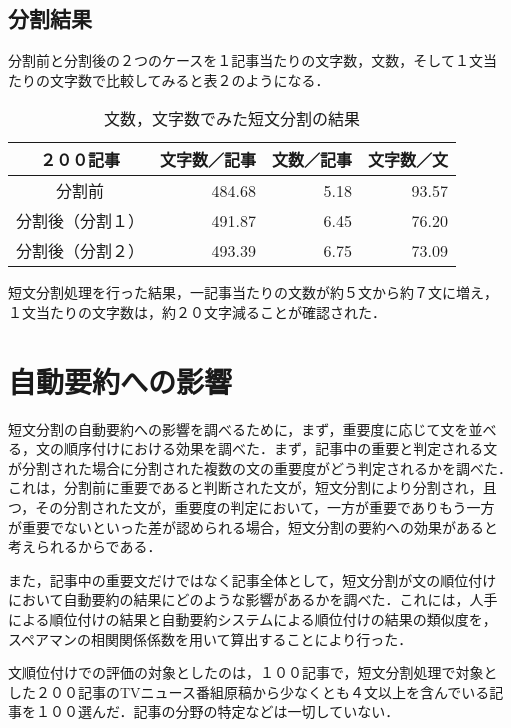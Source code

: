 \vspace{-3mm}
\subsection{分割結果}
分割前と分割後の２つのケースを１記事当たりの文字数，文数，そして１文当
たりの文字数で比較してみると表２のようになる．

\begin{table}[h]
\begin{center}
\begin{tabular}{|c|r|r|r|} \hline
２００記事       & 文字数／記事 & 文数／記事 & 文字数／文\\ \hline
分割前           & 484.68       & 5.18       & 93.57\\ \hline
分割後（分割１） & 491.87       & 6.45       & 76.20\\ \hline
分割後（分割２） & 493.39       & 6.75       & 73.09\\ \hline
\end{tabular}
\end{center}
\caption{文数，文字数でみた短文分割の結果}
\end{table}

\vspace{-3mm}
短文分割処理を行った結果，一記事当たりの文数が約５文から約７文に増え，
１文当たりの文字数は，約２０文字減ることが確認された．

\section{自動要約への影響}
短文分割の自動要約への影響を調べるために，まず，重要度に応じて文を並べ
る，文の順序付けにおける効果を調べた．まず，記事中の重要と判定される文
が分割された場合に分割された複数の文の重要度がどう判定されるかを調べた．
これは，分割前に重要であると判断された文が，短文分割により分割され，且
つ，その分割された文が，重要度の判定において，一方が重要でありもう一方
が重要でないといった差が認められる場合，短文分割の要約への効果があると
考えられるからである．

また，記事中の重要文だけではなく記事全体として，短文分割が文の順位付け
において自動要約の結果にどのような影響があるかを調べた．これには，人手
による順位付けの結果と自動要約システムによる順位付けの結果の類似度を，
スペアマンの相関関係係数を用いて算出することにより行った．

文順位付けでの評価の対象としたのは，１００記事で，短文分割処理で対象と
した２００記事のTVニュース番組原稿から少なくとも４文以上を含んでいる記
事を１００選んだ．記事の分野の特定などは一切していない．


